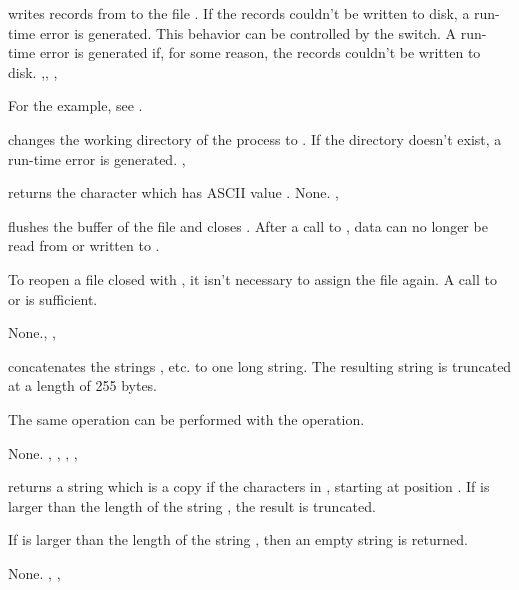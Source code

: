 \documentclass{report}
\begin{document}
\html{}

{ writes  records from  to the file
 . 
If the records couldn't be written to disk, a run-time error is generated.
This behavior can be controlled by the  switch. 
}
{A run-time error is generated if, for some reason, the records couldn't be
written to disk.}
{,, , }

For the example, see .

{ changes the working directory of the process to .}
{If the directory  doesn't exist, a run-time error is generated.}
{, }

\html{}

{ returns the character which has ASCII value .}
{None.}
{,}

\html{}

{ flushes the buffer of the file  and closes .
After a call to , data can no longer be read from or written to
.

To reopen a file closed with , it isn't necessary to assign the
file again. A call to  or  is sufficient.}
{None.}{, , }

\html{}

{ concatenates the strings , etc. to one long
string. The resulting string is truncated at a length of 255 bytes.

The same operation can be performed with the \var{+} operation.}
{None.}
{, , , , }

\html{}

{ returns a string which is a copy if the  characters
in , starting at position . If  is larger than
the length of the string , the result is truncated. 

If  is larger than the length of the string , then an
empty string is returned.}
{None.}
{, , }
\end{document}
